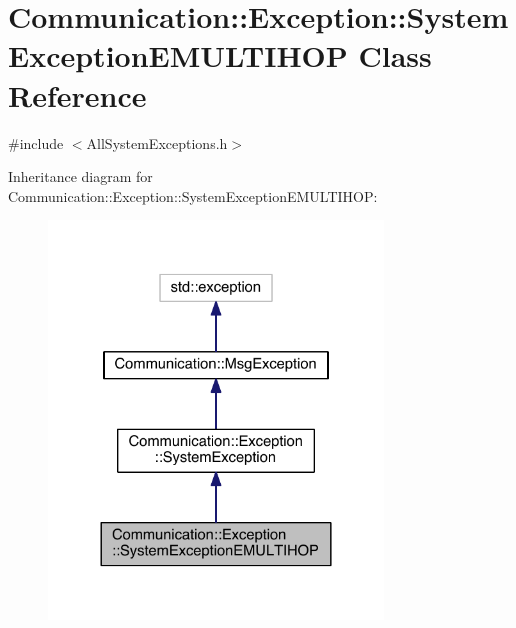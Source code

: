 \hypertarget{class_communication_1_1_exception_1_1_system_exception_e_m_u_l_t_i_h_o_p}{}\section{Communication\+:\+:Exception\+:\+:System\+Exception\+E\+M\+U\+L\+T\+I\+H\+O\+P Class Reference}
\label{class_communication_1_1_exception_1_1_system_exception_e_m_u_l_t_i_h_o_p}


{\ttfamily \#include $<$All\+System\+Exceptions.\+h$>$}



Inheritance diagram for Communication\+:\+:Exception\+:\+:System\+Exception\+E\+M\+U\+L\+T\+I\+H\+O\+P\+:\nopagebreak
\begin{figure}[H]
\begin{center}
\leavevmode
\includegraphics[width=252pt]{class_communication_1_1_exception_1_1_system_exception_e_m_u_l_t_i_h_o_p__inherit__graph}
\end{center}
\end{figure}


